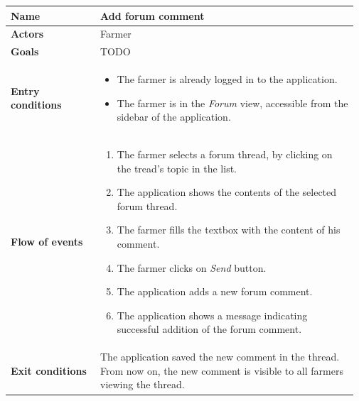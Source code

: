 \begin{table}[H]
    \centering
	\begin{tabular}{@{}p{0.25\linewidth} p{0.72\linewidth}@{}}
\toprule
		\textbf{Name}               & Add forum comment \\
		\midrule
		\textbf{Actors}             & Farmer\\
		\midrule
		\textbf{Goals}              & TODO \\
		\midrule
		
		\textbf{Entry conditions}   & \begin{itemize}[leftmargin=.4cm,noitemsep,topsep=0pt,before=\vspace{-3mm},after=\vspace{-4mm}]
		    \item The farmer is already logged in to the application.
		    \item The farmer is in the \textit{Forum} view, accessible from the sidebar of the application.
		\end{itemize}\\
		\midrule
		
		\textbf{Flow of events}     & \begin{enumerate}[leftmargin=.4cm,noitemsep,topsep=0pt,before=\vspace{-3mm},after=\vspace{-4mm}]
		    \item The farmer selects a forum thread, by clicking on the tread's topic in the list.
		    \item The application shows the contents of the selected forum thread.
		    \item The farmer fills the textbox with the content of his comment.
		    \item The farmer clicks on \textit{Send} button.
		    \item The application adds a new forum comment.
		    \item The application shows a message indicating successful addition of the forum comment.
		\end{enumerate}\\
		\midrule
		\textbf{Exit conditions} & The application saved the new comment in the thread. From now on, the new comment is visible to all farmers viewing the thread. \\
		\midrule
		

\end{tabular}
\end{table}

